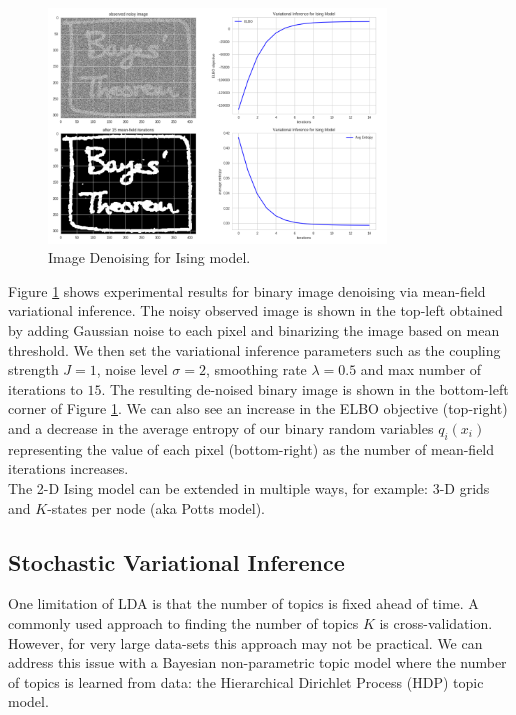 \begin{figure}[hptb]
    \centering
    \includegraphics[width=0.8\textwidth, trim={10 10 10 10}]{figures/ising_vi2.png}
    \caption{Image Denoising for Ising model.}
    \label{fig:ising_vi2}
\end{figure}

Figure \ref{fig:ising_vi2} shows experimental results for binary image denoising via mean-field variational inference. The noisy observed image is shown in the top-left obtained by adding Gaussian noise to each pixel and binarizing the image based on mean threshold. We then set the variational inference parameters such as the coupling strength $J=1$, noise level $\sigma = 2$, smoothing rate $\lambda=0.5$ and max number of iterations to $15$. The resulting de-noised binary image is shown in the bottom-left corner of Figure \ref{fig:ising_vi2}. We can also see an increase in the ELBO objective (top-right) and a decrease in the average entropy of our binary random variables $q_i(x_i)$ representing the value of each pixel (bottom-right) as the number of mean-field iterations increases.\\

The 2-D Ising model can be extended in multiple ways, for example: 3-D grids and $K$-states per node (aka Potts model).\\

\subsection{Stochastic Variational Inference}

One limitation of LDA is that the number of topics is fixed ahead of time. A commonly used approach to finding the number of topics $K$ is cross-validation. However, for very large data-sets this approach may not be practical. We can address this issue with a Bayesian non-parametric topic model where the number of topics is learned from data: the Hierarchical Dirichlet Process (HDP) topic model.\\

